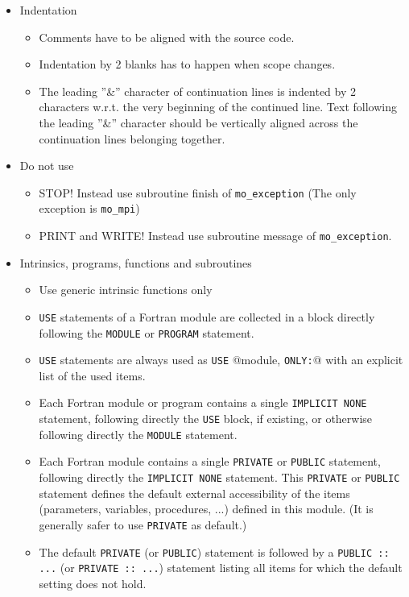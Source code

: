 \documentclass[a4paper,11pt,DIV16,BCOR1cm,titlepage]{scrartcl}
\begin{document}
\begin{itemize}
\begin{itemize}
\end{itemize}
%
\item Indentation  
\begin{itemize}
\item Comments have to be aligned with the source code.
\item Indentation by 2 blanks has to happen when scope changes.
\item The leading ''\&'' character of continuation lines is indented by 2 characters w.r.t. the very 
beginning of the continued line.  Text following the leading ''\&'' character should be vertically 
aligned across the continuation lines belonging together.
\end{itemize}
%
\item Do not use 
\begin{itemize}
\item STOP! Instead use subroutine finish of \texttt{mo\_exception} (The only exception 
is \texttt{mo\_mpi})
\item PRINT and WRITE! Instead use subroutine message of \texttt{mo\_exception}.
\end{itemize}
%
\item Intrinsics, programs, functions and subroutines
\begin{itemize}
\item Use generic intrinsic functions only
\item \texttt{USE} statements of a Fortran module are collected in a block directly following 
the \texttt{MODULE} or \texttt{PROGRAM} statement.
\item \texttt{USE} statements are always used as \texttt{USE} @module, \texttt{ONLY:}@ with 
an explicit list of the used items.
\item Each Fortran module or program contains a single \texttt{IMPLICIT NONE} statement, 
following directly the \texttt{USE} block, if existing, or otherwise following directly the \texttt
{MODULE} statement.
\item Each Fortran module contains a single \texttt{PRIVATE} or \texttt{PUBLIC} statement,
  following directly the \texttt{IMPLICIT NONE} statement. This \texttt{PRIVATE} or \texttt{PUBLIC}
  statement defines the default external accessibility of the items (parameters, variables, 
  procedures, ...) defined in this module. (It is generally safer to use \texttt{PRIVATE} as default.)
\item The default \texttt{PRIVATE} (or \texttt{PUBLIC}) statement is followed by a \texttt{PUBLIC :: ...} 
(or \texttt{PRIVATE :: ...}) statement listing all items for which the default setting does not hold.


\end{itemize}
\end{itemize}
\end{document}
